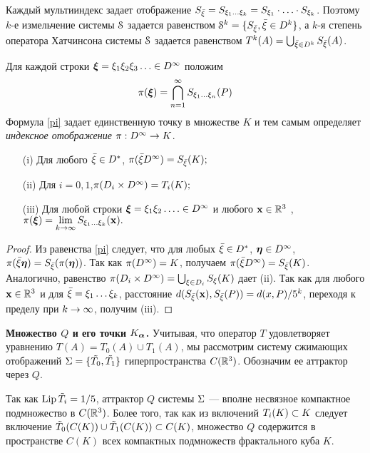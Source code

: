 Каждый мультииндекс задает отображение $S_{\bar{\xi}}=S_{\xi_1\ldots\xi_k}=S_{\xi_1}\cdot\ldots\cdot S_{\xi_k}$. 
Поэтому $k$-е измельчение системы ${\EuScript S}$ задается равенством ${\EuScript S}^k=\{S_{\bar{\xi}}, {\bar{\xi}}\in  D^k\}$, а $k$-я степень оператора Хатчинсона системы ${\EuScript S}$ задается равенством $T^k(A)=\bigcup_{{\bar{\xi}}\in D^k}S_{\bar{\xi}}(A)$.


Для каждой строки ${\bm{\xi}}=\xi_1\xi_2\xi_3\ldots\in  D^\infty$ положим
\begin{equation}\label{pi}
\pi({\bm{\xi}})=\bigcap\limits_{n=1}^\infty S_{\xi_1\ldots\xi_n}(P)
\end{equation}
Формула \eqref{pi} задает единственную точку в множестве $K$ и тем самым определяет {\em индексное отображение} $\pi:D^\infty\to K$.
\begin{lemma} \label{piD}
\begin{itemize}[nolistsep]
\item[{\rm (i)}] Для любого ${\bar{\xi}}\in D^*$, $\pi({\bar{\xi}} D^\infty)=S_{\bar{\xi}}(K);$
\item[{\rm (ii)}] Для $i=0,1$,\quad $\pi(D_i\times D^\infty)=T_i(K);$
\item[{\rm (iii)}] Для любой строки ${\bm{\xi}}=\xi_1\xi_2\ldots.\in D^\infty$ и  любого ${\bf{x}}\in\mathbb{R}^3$ , $\pi({\bm{\xi}})=\lim\limits_{k\to\infty}S_{\xi_1\ldots\xi_k}({\bf{x}}).$ 
\end{itemize}
\end{lemma}

\begin{proof}
Из равенства \eqref{pi} следует, что для любых ${\bar{\xi}}\in D^*$, ${\bm{\eta}}\in D^\infty$, $\pi({\bar{\xi}} {\bm{\eta}})=S_{\bar{\xi}}(\pi({\bm{\eta}}))$. 
Так как $\pi(D^\infty)=K$, получаем $\pi({\bar{\xi}} D^\infty)=S_{\bar{\xi}}(K)$.  
Аналогично, равенство $\pi(D_i\times D^\infty)=\bigcup_{\xi\in D_i}S_{\xi}(K)$ дает (ii). 
Так как для любого ${\bf{x}}\in\mathbb{R}^3$   и для  ${\bar{\xi}}=\xi_1\ldots\xi_k$, расстояние $d(S_{\bar{\xi}}({\bf{x}}),S_{\bar{\xi}}(P))=d(x,P)/5^k $, переходя к пределу при $k\to\infty$, получим (iii).
\end{proof}
  

{\bf Множество $Q$ и его точки $K_{\bm{\alpha}}$.}
Учитывая, что оператор $T$ удовлетворяет уравнению $T(A)=T_0(A)\cup T_1(A)$, мы рассмотрим систему сжимающих отображений $\Sigma=\{ \tilde{T_0},\tilde{T_1}\}$ гиперпространства $C(\mathbb{R}^3)$. 
Обозначим ее аттрактор через $Q$.

Так как $\mathop{\rm Lip} \nolimits{\tilde T_i}=1/5$, аттрактор $Q$ системы $\Sigma$ --- вполне несвязное компактное подмножество в $C(\mathbb{R}^3)$. 
Более того, так как из включений $T_i(K)\subset K$ следует включение ${\tilde T}_0(C(K))\cup {\tilde T}_1(C(K))\subset C(K)$, множество $Q$ содержится в пространстве  $C(K)$ всех компактных подмножеств фрактального куба $K$.

